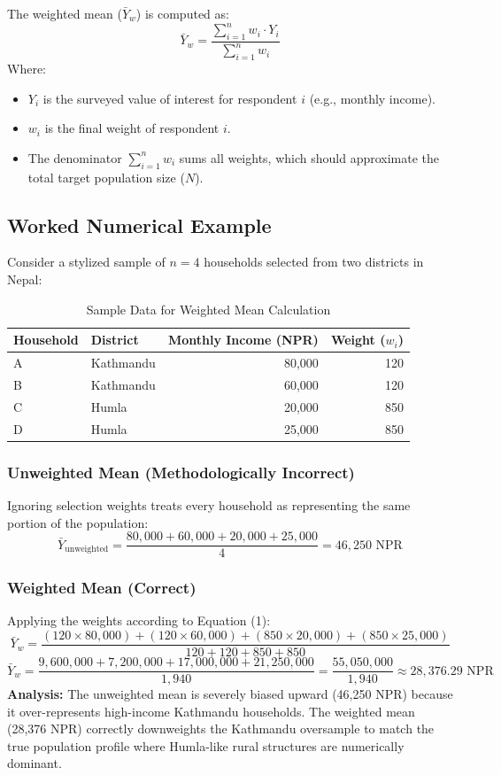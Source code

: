 \documentclass[11pt,a4paper]{article}
\begin{document}
The weighted mean ($\bar{Y}_w$) is computed as:
\begin{equation}
  \bar{Y}_w = \frac{\sum_{i=1}^{n} w_i \cdot Y_i}{\sum_{i=1}^{n} w_i}
\end{equation}
Where:
\begin{itemize}
  \item $Y_i$ is the surveyed value of interest for respondent $i$ (e.g., monthly income).
  \item $w_i$ is the final weight of respondent $i$.
  \item The denominator $\sum_{i=1}^{n} w_i$ sums all weights, which should approximate the total target population size ($N$).
\end{itemize}

\subsection{Worked Numerical Example}
Consider a stylized sample of $n = 4$ households selected from two districts in Nepal:

\begin{table}[htbp]
  \centering
  \caption{Sample Data for Weighted Mean Calculation}
  \label{tab:simple_example}
  \begin{tabular}{llrr}
    \toprule
    \textbf{Household} & \textbf{District} & \textbf{Monthly Income (NPR)} & \textbf{Weight ($w_i$)} \\
    \midrule
    A & Kathmandu & 80,000 & 120 \\
    B & Kathmandu & 60,000 & 120 \\
    C & Humla & 20,000 & 850 \\
    D & Humla & 25,000 & 850 \\
    \bottomrule
  \end{tabular}
\end{table}

\subsubsection{Unweighted Mean (Methodologically Incorrect)}
Ignoring selection weights treats every household as representing the same portion of the population:
\[
  \bar{Y}_{\text{unweighted}} = \frac{80,000 + 60,000 + 20,000 + 25,000}{4} = 46,250 \text{ NPR}
\]

\subsubsection{Weighted Mean (Correct)}
Applying the weights according to Equation (1):
\[
  \bar{Y}_w = \frac{(120 \times 80,000) + (120 \times 60,000) + (850 \times 20,000) + (850 \times 25,000)}{120 + 120 + 850 + 850}
\]
\[
  \bar{Y}_w = \frac{9,600,000 + 7,200,000 + 17,000,000 + 21,250,000}{1,940} = \frac{55,050,000}{1,940} \approx 28,376.29 \text{ NPR}
\]
\textbf{Analysis:} The unweighted mean is severely biased upward (46,250 NPR) because it over-represents high-income Kathmandu households. The weighted mean (28,376 NPR) correctly downweights the Kathmandu oversample to match the true population profile where Humla-like rural structures are numerically dominant.
\end{document}

